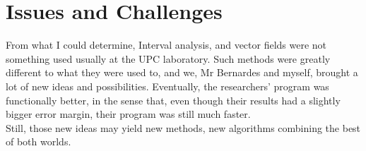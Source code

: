 \section{Issues and Challenges}

From what I could determine, Interval analysis, and vector fields were not something used usually at the UPC laboratory.
Such methods were greatly different to what they were used to, and we, Mr Bernardes and myself, brought a lot of new ideas and possibilities.
Eventually, the researchers' program was functionally better, in the sense that, even though their results had a slightly bigger error margin, their program was still much faster.\\
Still, those new ideas may yield new methods, new algorithms combining the best of both worlds.
